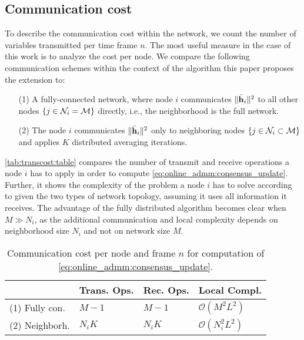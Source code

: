 \documentclass{article}
\begin{document}
\subsection[]{Communication cost}
\label{sec:transcost}
To describe the communication cost within the network, we count the number of variables transmitted per time frame \(n\).
The most useful measure in the case of this work is to analyze the cost per node.
We compare the following communication schemes within the context of the algorithm \cite{blochbergerDBSI} this paper proposes the extension to:
\begin{itemize}
    \itemsep-0.2em
    \item[(1)] A fully-connected network, where node \(i\) communicates \(\|\bar{\bm{\mathrm{h}}}_i\|^2\) to all other nodes \(\{j \in \mathcal{N}_i = \mathcal{M}\}\) directly, i.e., the neighborhood is the full network.
    \item[(2)] The node \(i\) communicates \(\|\bar{\bm{\mathrm{h}}}_i\|^2\) only to neighboring nodes \(\{j \in \mathcal{N}_i \subset \mathcal{M}\}\) and applies \(K\) distributed averaging iterations.
\end{itemize}
\autoref{tab:transcost:table} compares the number of transmit and receive operations a node \(i\) has to apply in order to compute \eqref{eq:online_admm:consensus_update}.
Further, it shows the complexity of the problem a node \(i\) has to solve according to \cite{blochbergerDBSI} given the two types of network topology, assuming it uses all information it receives.
The advantage of the fully distributed algorithm becomes clear when \(M \gg N_i\), as the additional communication and local complexity depends on neighborhood size \(N_i\) and not on network size \(M\).
\vspace*{-0.6em}
\renewcommand{\arraystretch}{1.2}
\begin{table}[h]
    \centering
    \begin{tabular}{ |l|l|l|l| }
        \hline
        & Trans. Ops. & Rec. Ops. & Local Compl. \\
        \hline\hline
        (1) Fully con. & \(M-1\) & \(M-1\) & \(\mathcal{O}(M^2 L^2)\) \\
        \hline
        (2) Neighborh. & \(N_i K\) & \(N_i K\) & \(\mathcal{O}(N_i^2 L^2)\)\\ 
        \hline
    \end{tabular}
    \caption[]{Communication cost per node and frame \(n\) for computation of \eqref{eq:online_admm:consensus_update}.}
    \label{tab:transcost:table}
\end{table}
\renewcommand{\arraystretch}{1.0}
\end{document}

